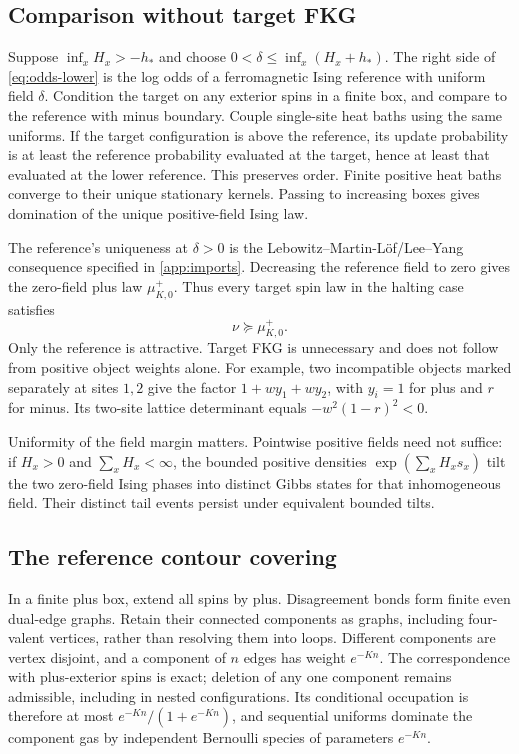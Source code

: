 \documentclass[11pt,reqno]{amsart}
\numberwithin{equation}{section}
\theoremstyle{definition}
\theoremstyle{remark}
\begin{document}
\subsection{Comparison without target FKG}\label{sec:comparison}
Suppose $\inf_xH_x>-h_*$ and choose $0<\delta\leq\inf_x(H_x+h_*)$. The right side of \eqref{eq:odds-lower} is the log odds of a ferromagnetic Ising reference with uniform field $\delta$. Condition the target on any exterior spins in a finite box, and compare to the reference with minus boundary. Couple single-site heat baths using the same uniforms. If the target configuration is above the reference, its update probability is at least the reference probability evaluated at the target, hence at least that evaluated at the lower reference. This preserves order. Finite positive heat baths converge to their unique stationary kernels. Passing to increasing boxes gives domination of the unique positive-field Ising law.

The reference's uniqueness at $\delta>0$ is the Lebowitz--Martin-L\"of/Lee--Yang consequence specified in \cref{app:imports}. Decreasing the reference field to zero gives the zero-field plus law $\mu_{K,0}^+$. Thus every target spin law in the halting case satisfies
\begin{equation}\label{eq:domplus}
 \nu\succeq\mu_{K,0}^+.
\end{equation}
Only the reference is attractive. Target FKG is unnecessary and does not follow from positive object weights alone. For example, two incompatible objects marked separately at sites $1,2$ give the factor $1+w y_1+w y_2$, with $y_i=1$ for plus and $r$ for minus. Its two-site lattice determinant equals $-w^2(1-r)^2<0$.

Uniformity of the field margin matters. Pointwise positive fields need not suffice: if $H_x>0$ and $\sum_xH_x<\infty$, the bounded positive densities $\exp(\sum_xH_xs_x)$ tilt the two zero-field Ising phases into distinct Gibbs states for that inhomogeneous field. Their distinct tail events persist under equivalent bounded tilts.

\subsection{The reference contour covering}
In a finite plus box, extend all spins by plus. Disagreement bonds form finite even dual-edge graphs. Retain their connected components as graphs, including four-valent vertices, rather than resolving them into loops. Different components are vertex disjoint, and a component of $n$ edges has weight $e^{-Kn}$. The correspondence with plus-exterior spins is exact; deletion of any one component remains admissible, including in nested configurations. Its conditional occupation is therefore at most $e^{-Kn}/(1+e^{-Kn})$, and sequential uniforms dominate the component gas by independent Bernoulli species of parameters $e^{-Kn}$.
\end{document}
